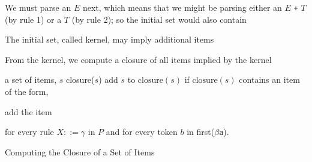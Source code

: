 \documentclass[8pt,a4paper,compress]{beamer}
\newcommand{\mm}[1]{$#1$}
\newenvironment{spaced}
{
\smallskip
\hspace{.5cm}
\begin{minipage}[c]{\textwidth}
}
{
\end{minipage}
\smallskip
}
\begin{document}
\begin{frame}[fragile]
\pause

We must parse an $E$ next, which means that we might be parsing either an $E$ \lstinline{+} $T$ (by rule 1) or a $T$ (by rule 2); so the initial set would also contain

\text{ }
\begin{spaced}
\begin{production}
[\mm{E}  ::= \mm{\cdot} \mm{E} \lstinline{+} \mm{T}, \lstinline{#}]
[\mm{E}  ::= \mm{\cdot} \mm{T}, \lstinline{#}]
\end{production}
\end{spaced}

\pause

The initial set, called kernel, may imply additional items

\pause
\bigskip

From the kernel, we compute a closure of all items implied by the kernel

\pause
\bigskip

\begin{algorithm}[H]
\begin{algorithmic}
\REQUIRE a set of items, $s$
\ENSURE closure($s$)
\STATE add $s$ to $\text{closure}(s)$
\REPEAT
\STATE if $\text{closure}(s)$ contains an item of the form,

\begin{production}
[\mm{Y} ::= \mm{\alpha \cdot} \mm{X} \mm{\beta}, \lstinline{a}]
\end{production}

\noindent add the item

\begin{production}
[\mm{X} ::= \mm{\cdot \gamma}, \lstinline{b}]
\end{production}

\noindent for every rule $X ::= \gamma$ in $P$ and for every token $b$ in first($\beta$\lstinline{a}).
\end{algorithmic}
\caption{Computing the Closure of a Set of Items}
\end{algorithm}
\end{frame}
\end{document}
